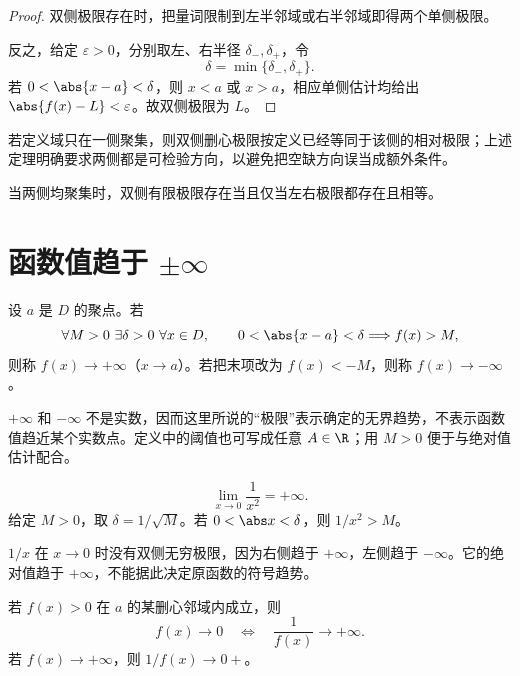 \begin{proof}
双侧极限存在时，把量词限制到左半邻域或右半邻域即得两个单侧极限。

反之，给定 \(\varepsilon>0\)，分别取左、右半径 \(\delta_-,\delta_+\)，令
\[
 \delta=\min\{\delta_-,\delta_+\}.
\]
若 \(0<\abs{x-a}<\delta\)，则 \(x<a\) 或 \(x>a\)，相应单侧估计均给出 \(\abs{f(x)-L}<\varepsilon\)。故双侧极限为 \(L\)。
\end{proof}

若定义域只在一侧聚集，则双侧删心极限按定义已经等同于该侧的相对极限；上述定理明确要求两侧都是可检验方向，以避免把空缺方向误当成额外条件。

\begin{corollary}
当两侧均聚集时，双侧有限极限存在当且仅当左右极限都存在且相等。
\end{corollary}

\section{函数值趋于 \texorpdfstring{\(\pm\infty\)}{infinity}}

\begin{definition}[无穷极限]
设 \(a\) 是 \(D\) 的聚点。若
\[
 \forall M>0\ \exists\delta>0\ \forall x\in D,\qquad
 0<\abs{x-a}<\delta\Longrightarrow f(x)>M,
\]
则称 \(f(x)\to+\infty\)（\(x\to a\)）。若把末项改为 \(f(x)<-M\)，则称 \(f(x)\to-\infty\)。
\end{definition}

\(+\infty\) 和 \(-\infty\) 不是实数，因而这里所说的“极限”表示确定的无界趋势，不表示函数值趋近某个实数点。定义中的阈值也可写成任意 \(A\in\R\)；用 \(M>0\) 便于与绝对值估计配合。

\begin{example}
\[
 \lim_{x\to0}\frac1{x^2}=+\infty.
\]
给定 \(M>0\)，取 \(\delta=1/\sqrt M\)。若 \(0<\abs x<\delta\)，则 \(1/x^2>M\)。
\end{example}

\begin{counterexample}
\(1/x\) 在 \(x\to0\) 时没有双侧无穷极限，因为右侧趋于 \(+\infty\)，左侧趋于 \(-\infty\)。它的绝对值趋于 \(+\infty\)，不能据此决定原函数的符号趋势。
\end{counterexample}

\begin{proposition}[倒数联系]
若 \(f(x)>0\) 在 \(a\) 的某删心邻域内成立，则
\[
 f(x)\to0
 \quad\Longleftrightarrow\quad
 \frac1{f(x)}\to+\infty.
\]
若 \(f(x)\to+\infty\)，则 \(1/f(x)\to0+\)。
\end{proposition}

